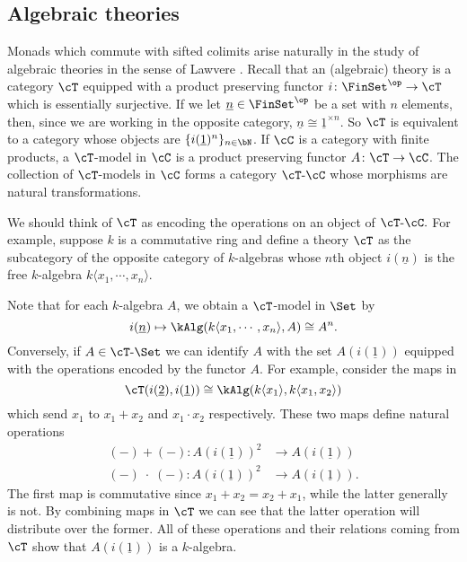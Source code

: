 \documentclass[leqno,oneside,english]{elsarticle}
\begin{document}
\subsection{Algebraic theories}\label{sec:algebraic-theories}
Monads which commute with sifted colimits arise naturally in the study
of algebraic theories in the sense of Lawvere \cite{Law04}. Recall that
an (algebraic) theory is a category $\cT$ equipped with a product
preserving functor $i\colon\FinSet^{\op}\rightarrow \cT$ which is
essentially surjective. If we let $\underline{n}\in \FinSet^{\op}$ be a set
with $n$ elements, then, since we are working in the opposite category,
$\underline{n}\cong \underline{1}^{\times n}$. So $\cT$ is equivalent to
a category whose objects are $\{i(\underline{1})^n\}_{n\in \bN}$.  If
$\cC$ is a category with finite products, a $\cT$-model in $\cC$ is a
product preserving functor $A\colon\cT\rightarrow \cC$. The collection
of $\cT$-models in $\cC$ forms a category ${{\cT}\text{-}{\cC}}$ whose
morphisms are natural transformations.

We should think of $\cT$ as encoding the operations on an object of
${{\cT}\text{-}{\cC}}.$ For example, suppose $k$ is a commutative ring and define a
theory $\cT$ as the subcategory of the opposite category of
$k$-algebras whose $n$th object $i(\underline{n})$ is the free $k$-algebra
$k\langle x_1,\cdots,x_n\rangle$.

Note that for each $k$-algebra $A$, we obtain a $\cT$-model in $\Set$ by
\[
i(\underline{n})\mapsto \kAlg(k\langle x_1,\cdots,x_n\rangle, A)\cong A^n.
\]
Conversely, if $A\in {{\cT}\text{-}{\Set}}$ we can identify $A$ with the
set $A(i(\underline{1}))$ equipped with the operations encoded by the
functor $A$.  For example, consider the maps in
\[
\cT(i(\underline{2}),i(\underline{1})) \cong 
\kAlg(k\langle x_1\rangle,k\langle x_1,x_2\rangle)
\]
which send $x_1$ to $x_1+x_2$ and  $x_1\cdot x_2$ respectively. These
two maps define natural operations
\begin{align*}
  (-) + (-)\colon A(i(\underline{1}))^2
  &
  \rightarrow A(i(\underline{1})) \\
  (-) \; \cdot \; (-)\colon A(i(\underline{1}))^2
  &
  \rightarrow A(i(\underline{1})).
\end{align*}
The first map is commutative since $x_1+x_2=x_2+x_1$, while the latter
generally is not. By combining maps in $\cT$ we can see that the
latter operation will distribute over the former. All of these
operations and their relations coming from $\cT$ show that
$A(i(\underline{1}))$ is a $k$-algebra.
\end{document}
